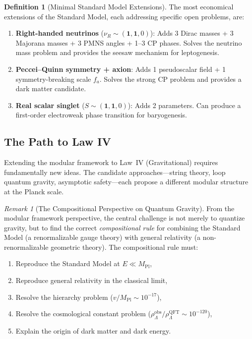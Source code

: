 \documentclass[12pt]{article}
\theoremstyle{definition}
\newtheorem{definition}[theorem]{Definition}
\theoremstyle{remark}
\newtheorem{remark}[theorem]{Remark}
\newcommand{\Mpl}{M_{\mathrm{Pl}}}
\begin{document}
\begin{definition}[Minimal Standard Model Extensions]
\label{def:minimal-extensions}
The most economical extensions of the Standard Model, each addressing specific open problems, are:
\begin{enumerate}
\item \textbf{Right-handed neutrinos} ($\nu_R \sim (\mathbf{1},\mathbf{1},0)$): Adds 3 Dirac masses + 3 Majorana masses + 3 PMNS angles + 1--3 CP phases. Solves the neutrino mass problem and provides the seesaw mechanism for leptogenesis.
\item \textbf{Peccei--Quinn symmetry + axion}: Adds 1 pseudoscalar field + 1 symmetry-breaking scale $f_a$. Solves the strong CP problem and provides a dark matter candidate.
\item \textbf{Real scalar singlet} ($S \sim (\mathbf{1},\mathbf{1},0)$): Adds 2 parameters. Can produce a first-order electroweak phase transition for baryogenesis.
\end{enumerate}
\end{definition}

\subsection{The Path to Law IV}

Extending the modular framework to Law~IV (Gravitational) requires fundamentally new ideas. The candidate approaches---string theory, loop quantum gravity, asymptotic safety---each propose a different modular structure at the Planck scale.

\begin{remark}[The Compositional Perspective on Quantum Gravity]
From the modular framework perspective, the central challenge is not merely to quantize gravity, but to find the correct \emph{compositional rule} for combining the Standard Model (a renormalizable gauge theory) with general relativity (a non-renormalizable geometric theory). The compositional rule must:
\begin{enumerate}
\item Reproduce the Standard Model at $E \ll \Mpl$,
\item Reproduce general relativity in the classical limit,
\item Resolve the hierarchy problem ($v/\Mpl \sim 10^{-17}$),
\item Resolve the cosmological constant problem ($\rho_\Lambda^{\mathrm{obs}}/\rho_\Lambda^{\mathrm{QFT}} \sim 10^{-120}$),
\item Explain the origin of dark matter and dark energy.
\end{enumerate}
\end{remark}
\end{document}
